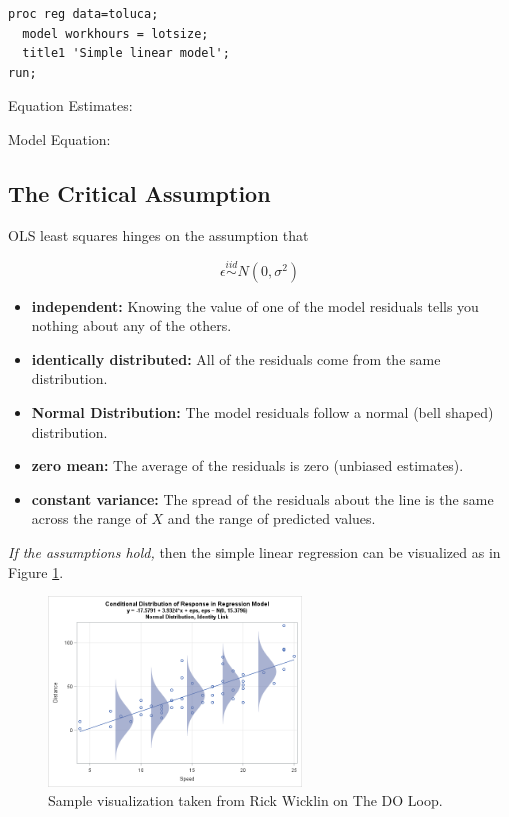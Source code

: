 \documentclass[12pt]{notes}
\begin{document}
\begin{verbatim}
proc reg data=toluca;
  model workhours = lotsize;
  title1 'Simple linear model';
run;
\end{verbatim}

\nspace
Equation Estimates:

\begin{minipage}[l][1cm][c]{\textwidth}
\end{minipage}

\nspace
Model Equation:

\begin{minipage}[l][1cm][c]{\textwidth}
\end{minipage}

\subsection*{The Critical Assumption}
OLS least squares hinges on the assumption that

\[\epsilon \stackrel{iid}{\sim} N(0, \sigma^2)\]

\begin{itemize}
\item \textbf{independent:} Knowing the value of one of the model residuals tells you nothing about any of the others. 
\item \textbf{identically distributed:} All of the residuals come from the same distribution.
\item \textbf{Normal Distribution:} The model residuals follow a normal (bell shaped) distribution. 
\item \textbf{zero mean:} The average of the residuals is zero (unbiased estimates). 
\item \textbf{constant variance:} The spread of the residuals about the line is the same across the range of $X$ and the range of predicted values. 
\end{itemize}

\textit{If the assumptions hold,} then the simple linear regression can be visualized as in Figure \ref{wicklin}.

\begin{figure}[H]
\centering
\includegraphics[width = 0.6\textwidth]{figures/module2/normalPic_wicklin.png}
\caption{Sample visualization taken from Rick Wicklin on The DO Loop.}
\label{wicklin}
\end{figure}
\end{document}
